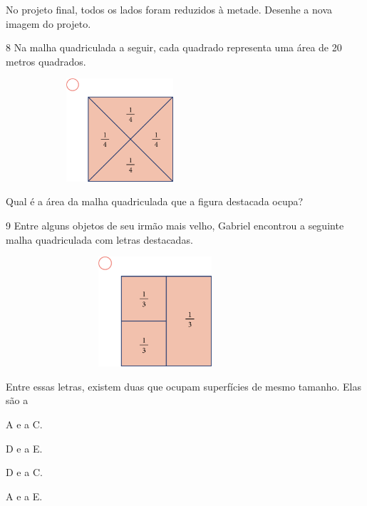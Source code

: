 \begin{mdframed}[linewidth=2pt,linecolor=salmao,roundcorner=2pt]
No projeto final, todos os lados foram reduzidos à metade. Desenhe a nova imagem do projeto.

\begin{mdframed}[linewidth=2pt,linecolor=salmao,roundcorner=2pt]
\vspace{8cm}
\end{mdframed}

\num{8} Na malha quadriculada a seguir, cada quadrado representa uma área de 20
metros quadrados.

\includegraphics[width=3.33333in,height=1.50517in]{media/image68.png}

Qual é a área da malha quadriculada que a figura destacada ocupa?

\begin{mdframed}[linewidth=2pt,linecolor=salmao,roundcorner=2pt]
\vspace{2cm}
\end{mdframed}

\num{9} Entre alguns objetos de seu irmão mais velho, Gabriel encontrou a seguinte
malha quadriculada com letras destacadas.

\includegraphics[width=4.36538in,height=1.60417in]{media/image69.png}

Entre essas letras, existem duas que ocupam superfícies de mesmo tamanho. Elas são a

\begin{scolha}
\item
  A e a C.
\item
  D e a E.
\item
  D e a C.
\item
  A e a E.
\end{scolha}


\end{mdframed}
